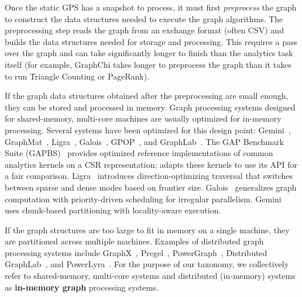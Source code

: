 Once the static \ac{GPS} has a snapshot to process, it must first \emph{preprocess} the graph to construct the data structures needed to execute the graph algorithms.
The preprocessing step reads the graph from an exchange format (often CSV) and builds the data structures needed for storage and processing.
This requires a pass over the graph and can take significantly longer to finish than the analytics task itself (for example, GraphChi takes longer to preprocess the graph than it takes to run Triangle Counting or PageRank).

If the graph data structures obtained after the preprocessing are small enough, they can be stored and processed in memory.
Graph processing systems designed for shared-memory, multi-core machines are usually optimized for in-memory processing.
Several systems have been optimized for this design point: Gemini~\cite{zhu2016gemini}, GraphMat~\cite{graphmat}, Ligra~\cite{shun2013ligra}, Galois~\cite{pingali2011tao}, GPOP~\cite{lakhotia2020gpop}, and GraphLab~\cite{low2012distributed}.
The GAP Benchmark Suite (GAPBS)~\cite{beamer2015gap} provides optimized reference implementations of common analytics kernels on a CSR representation; \project{} adapts these kernels to use its API for a fair comparison.
Ligra~\cite{shun2013ligra} introduces direction-optimizing traversal that switches between sparse and dense modes based on frontier size.
Galois~\cite{nguyen2013lightweight} generalizes graph computation with priority-driven scheduling for irregular parallelism.
Gemini~\cite{zhu2016gemini} uses chunk-based partitioning with locality-aware execution.

If the graph structures are too large to fit in memory on a single machine, they are partitioned across multiple machines.
Examples of distributed graph processing systems include GraphX~\cite{gonzalez2014graphx}, Pregel~\cite{malewicz2010pregel}, PowerGraph~\cite{gonzalez2012powergraph}, Distributed GraphLab~\cite{low2012distributed}, and PowerLyra~\cite{powerlyra2019}.
For the purpose of our taxonomy, we collectively refer to shared-memory, multi-core systems and distributed (in-memory) systems as \textbf{in-memory graph} processing systems.

